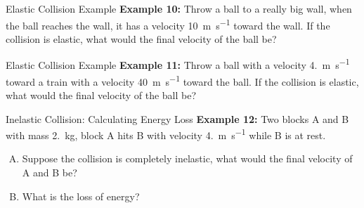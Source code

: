 \documentclass[12pt,compress,aspectratio=169]{beamer}
\begin{document}
\begin{frame}{Elastic Collision Example}
  \textbf{Example 10:} Throw a ball to a really big wall, when the ball reaches
  the wall, it has a velocity \SI{10}{\metre\per\second} toward the wall. If
  the collision is elastic, what would the final velocity of the ball be?
\end{frame}



\begin{frame}{Elastic Collision Example}
  \textbf{Example 11:} Throw a ball with a velocity \SI{4.}{\metre\per\second}
  toward a train with a velocity \SI{40}{\metre\per\second} toward the ball.
  If the collision is elastic, what would the final velocity of the ball be?
\end{frame}


\begin{frame}{Inelastic Collision: Calculating Energy Loss}
  \textbf{Example 12:} Two blocks A and B with mass \SI{2.}{\kilo\gram}, block
  A hits B with velocity \SI{4.}{\metre\per\second} while B is at rest.
  \begin{enumerate}[A.]
  \item Suppose the collision is completely inelastic, what would the final
    velocity of A and B be?
  \item What is the loss of energy?
  \end{enumerate}
\end{frame}
\end{document}
